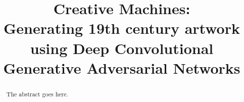 \documentclass[conference]{IEEEtran}
\begin{document}
%
\title{Creative Machines:\\ Generating 19th century artwork using Deep Convolutional Generative Adversarial Networks}


\author{
}

% 








\maketitle

\begin{abstract}
The abstract goes here.
\end{abstract}
\end{document}
